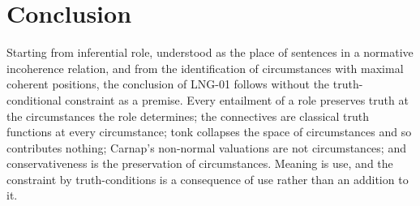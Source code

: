 \documentclass{situationist-preprint}
\begin{document}
\section{Conclusion}

Starting from inferential role, understood as the place of sentences in a normative incoherence relation, and from the identification of circumstances with maximal coherent positions, the conclusion of LNG-01 follows without the truth-conditional constraint as a premise. Every entailment of a role preserves truth at the circumstances the role determines; the connectives are classical truth functions at every circumstance; tonk collapses the space of circumstances and so contributes nothing; Carnap's non-normal valuations are not circumstances; and conservativeness is the preservation of circumstances. Meaning is use, and the constraint by truth-conditions is a consequence of use rather than an addition to it.
\end{document}
